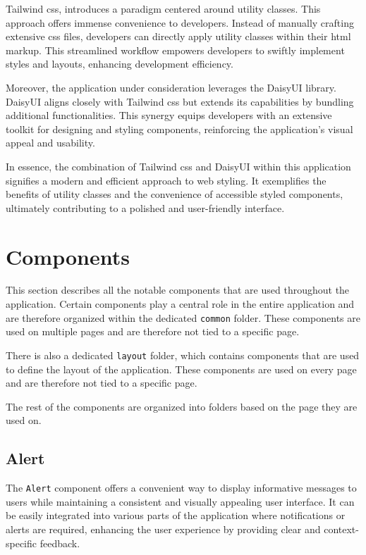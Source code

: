 Tailwind \acrshort{css}, introduces a paradigm centered around utility classes. This approach offers immense convenience to developers. Instead of manually crafting extensive \acrshort{css} files, developers can directly apply utility classes within their \acrshort{html} markup. This streamlined workflow empowers developers to swiftly implement styles and layouts, enhancing development efficiency.

Moreover, the application under consideration leverages the DaisyUI library. DaisyUI aligns closely with Tailwind \acrshort{css} but extends its capabilities by bundling additional functionalities. This synergy equips developers with an extensive toolkit for designing and styling components, reinforcing the application's visual appeal and usability.\cite{why-daisy}

In essence, the combination of Tailwind \acrshort{css} and DaisyUI within this application signifies a modern and efficient approach to web styling. It exemplifies the benefits of utility classes and the convenience of accessible styled components, ultimately contributing to a polished and user-friendly interface.

\section{Components}

This section describes all the notable components that are used throughout the application. Certain components play a central role in the entire application and are therefore organized within the dedicated \texttt{common} folder. These components are used on multiple pages and are therefore not tied to a specific page.

There is also a dedicated \texttt{layout} folder, which contains components that are used to define the layout of the application. These components are used on every page and are therefore not tied to a specific page.

The rest of the components are organized into folders based on the page they are used on.

\subsection{Alert}

The \texttt{Alert} component offers a convenient way to display informative messages to users while maintaining a consistent and visually appealing user interface. It can be easily integrated into various parts of the application where notifications or alerts are required, enhancing the user experience by providing clear and context-specific feedback.

